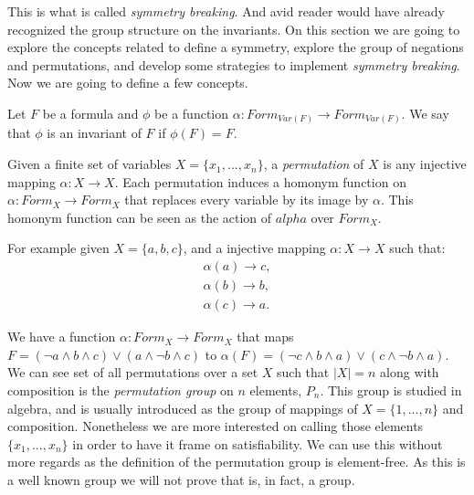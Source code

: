 This is what is called \emph{symmetry breaking}. And avid reader would have already recognized the group structure on the invariants.  On this section we are going to explore the concepts related to define a symmetry, explore the group of negations and permutations, and develop some strategies to implement \emph{symmetry breaking}.  Now we are going to define a few concepts.


\begin{definition}
Let $F$ be a formula and $\phi$ be a function $\alpha:Form_{Var(F)}\to Form_{Var(F)}$. We say that $\phi$ is an invariant of $F$ if $\phi(F) = F$.
\end{definition}
    
\begin{definition}[Permutation]
    Given a finite set of variables $X = \{x_1,...,x_n\}$, a \emph{permutation} of $X$ is any injective mapping $\alpha:X \to X$. Each permutation induces a homonym function on $\alpha: Form_X \to Form_X$  that replaces every variable by its image by $\alpha$. This homonym function can be seen as the action of $alpha$ over $Form_X$.
\end{definition}

      For example given $X = \{a,b,c\}$, and a injective mapping $\alpha:X\to X$ such that: 
  \begin{equation}
     \begin{split}
       \alpha(a) \to c,\\
       \alpha(b) \to b,\\
       \alpha(c) \to a.
     \end{split}
 \end{equation}

 We have a function $\alpha :Form_{X}\to Form_{X}$ that maps $F = (\neg a \land b  \land c) \lor (a \land \neg b \land c)$ to $\alpha(F) = (\neg c \land b  \land a) \lor (c \land \neg b \land a)$.\\


 We can see set of all permutations over a set $X$ such that $|X|=n$ along with composition is the \emph{permutation group} on $n$ elements, $P_n$. This group is studied in algebra, and is usually introduced as the group of mappings of $X=\{1,...,n\}$ and composition. Nonetheless we are more interested on calling those elements $\{x_1,...,x_n\}$ in order to have it frame on satisfiability. We can use this without more regards as the definition of the permutation group is element-free. As this is a well known group we will not prove that is, in fact, a group.\\


